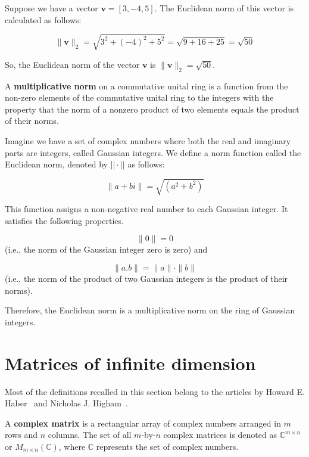 \begin{example}
    Suppose we have a vector \( \mathbf{v} = [3, -4, 5] \). The Euclidean norm of this vector is calculated as follows:

\[ \|\mathbf{v}\|_2 = \sqrt{3^2 + (-4)^2 + 5^2} = \sqrt{9 + 16 + 25} = \sqrt{50} \]

So, the Euclidean norm of the vector \( \mathbf{v} \) is \( \|\mathbf{v}\|_2 = \sqrt{50} \).
\end{example}
\begin{definition}
A \textbf{multiplicative norm} on a commutative unital ring is a function from the non-zero elements of the commutative unital ring to the integers with the property that the norm of a nonzero product of two elements equals the product of their norms.
\bigskip\bigskip
\begin{example}
Imagine we have a set of complex numbers where both the real and imaginary parts are integers, called Gaussian integers. We define a norm function called the Euclidean norm, denoted by $||\cdot ||$ as follows:

$$\|a + bi\| = \sqrt{(a^2 + b^2)}$$

This function assigns a non-negative real number to each Gaussian integer. It satisfies the following properties.

$$\|0\| = 0$$  (i.e., the norm of the Gaussian integer zero is zero) and

$$\|a.b\| = \|a\| \cdot \|b\|$$ (i.e., the norm of the product of two Gaussian integers is the product of their norms).

Therefore, the Euclidean norm is a multiplicative norm on the ring of Gaussian integers.
\end{example}

\section{Matrices of infinite dimension}
Most of the definitions recalled in this section belong to the articles by Howard E. Haber~\cite{haber2018notes} and Nicholas J. Higham~\cite{hale2008computing}.

\begin{definition}
   A \textbf{complex matrix} is a rectangular array of complex numbers arranged in \(m\) rows and \(n\) columns. The set of all $m$-by-$n$ complex matrices is denoted as \(\mathbb{C}^{m \times n}\) or \(M_{m \times n}(\mathbb{C})\), where \(\mathbb{C}\) represents the set of complex numbers.
\end{definition}



\end{definition}
